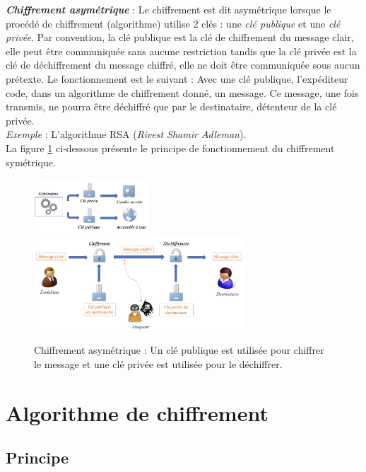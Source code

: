 \documentclass[oneside]{book}
\begin{document}
\textbf{\textit{Chiffrement asymétrique}} : Le chiffrement est dit asymétrique lorsque le procédé de chiffrement (algorithme) utilise 2 clés : une \textit{clé publique} et une \textit{clé privée}. Par convention, la clé publique est la clé de chiffrement du message clair, elle peut être communiquée sans aucune restriction tandis que la clé privée est la clé de déchiffrement du message chiffré, elle ne doit être communiquée sous aucun prétexte. Le fonctionnement est le suivant : Avec une clé publique, l'expéditeur code, dans un algorithme de chiffrement donné, un message. Ce message, une fois transmis, ne pourra être déchiffré que par le destinataire, détenteur de la clé privée. \\
\textit{Exemple} : L'algorithme RSA (\textit{Rivest Shamir Adleman}). \\

La figure \ref{fig:asymétrique} ci-dessous présente le principe de fonctionnement du chiffrement symétrique.

\begin{figure}[htbp]
    \centering
    \includegraphics[width=0.38\textwidth]{image/cle_asymetrique}
    \includegraphics[width=0.7\textwidth]{image/asymetrique}
    \caption{Chiffrement asymétrique : Un clé publique est utilisée pour chiffrer le message et une clé privée est utilisée pour le déchiffrer.}
    \label{fig:asymétrique}
\end{figure}

\section{Algorithme de chiffrement}
\label{sec:Introduction}

\subsection{Principe}
\label{sec:Introduction}
\end{document}
